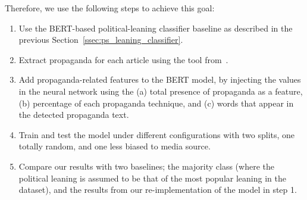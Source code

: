 Therefore, we use the following steps to achieve this goal:
\begin{enumerate}
    \item Use the BERT-based political-leaning classifier baseline as described in the previous Section~\ref{ssec:ps_leaning_classifier}.
    \item Extract propaganda for each article using the tool from~\citet{da2019fine}.
    \item Add propaganda-related features to the BERT model, by injecting the values in the neural network using the (a) total presence of propaganda as a feature, (b) percentage of each propaganda technique, and (c) words that appear in the detected propaganda text.
    \item Train and test the model under different configurations with two splits, one totally random, and one less biased to media source.
    \item Compare our results with two baselines; the majority class (where the political leaning is assumed to be that of the most popular leaning in the dataset), and the results from our re-implementation of the model in step 1. %
\end{enumerate}


